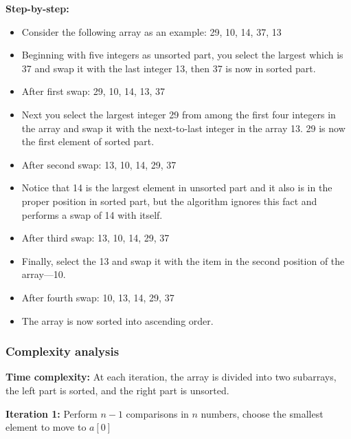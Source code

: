 \textbf{Step-by-step:}
\begin{itemize}[label=-]
    \item Consider the following array as an example: { 29, 10, 14, 37, 13}

    \item Beginning with five integers as unsorted part, you select the largest which is 37 and swap it with the last integer 13, then 37 is now in sorted part.

    \item After first swap: {29, 10, 14, 13, 37}

    \item Next you select the largest integer 29 from among the first four integers in the array and swap it with the next-to-last integer in the array 13. 29 is now the first element of sorted part.

    \item After second swap: {13, 10, 14, 29, 37}

    \item Notice that 14 is the largest element in unsorted part and it also is in the proper position in sorted part, but the algorithm ignores this fact and performs a swap of 14 with itself.

    \item After third swap: {13, 10, 14, 29, 37}

    \item Finally, select the 13 and swap it with the item in the second position of the array—10.

    \item After fourth swap: {10, 13, 14, 29, 37}

    \item The array is now sorted into ascending order.
\end{itemize}

\vspace{5pt}

\subsubsection{Complexity analysis}

\textbf{Time complexity:}
At each iteration, the array is divided into two subarrays, the left part is sorted, and the right part is unsorted.

\textbf{Iteration 1:} Perform $n - 1$ comparisons in $n$ numbers, choose the smallest element to move to $a[0]$

